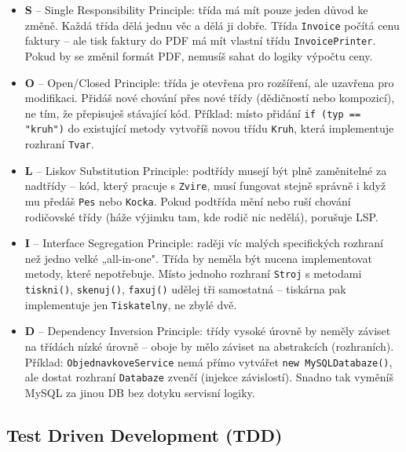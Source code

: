 \begin{itemize}
  \item \textbf{S} -- Single Responsibility Principle: třída má mít pouze jeden důvod ke změně.
    Každá třída dělá jednu věc a dělá ji dobře. Třída \texttt{Invoice} počítá cenu faktury --
    ale tisk faktury do PDF má mít vlastní třídu \texttt{InvoicePrinter}. Pokud by se změnil
    formát PDF, nemusíš sahat do logiky výpočtu ceny.

  \item \textbf{O} -- Open/Closed Principle: třída je otevřena pro rozšíření, ale uzavřena pro
    modifikaci. Přidáš nové chování přes nové třídy (dědičností nebo kompozicí), ne tím, že
    přepisuješ stávající kód. Příklad: místo přidání \texttt{if (typ == "kruh")} do existující
    metody vytvoříš novou třídu \texttt{Kruh}, která implementuje rozhraní \texttt{Tvar}.

  \item \textbf{L} -- Liskov Substitution Principle: podtřídy musejí být plně zaměnitelné za
    nadtřídy -- kód, který pracuje s \texttt{Zvire}, musí fungovat stejně správně i když mu
    předáš \texttt{Pes} nebo \texttt{Kocka}. Pokud podtřída mění nebo ruší chování rodičovské
    třídy (háže výjimku tam, kde rodič nic nedělá), porušuje LSP.

  \item \textbf{I} -- Interface Segregation Principle: raději víc malých specifických rozhraní
    než jedno velké „all-in-one". Třída by neměla být nucena implementovat metody, které
    nepotřebuje. Místo jednoho rozhraní \texttt{Stroj} s metodami \texttt{tiskni()},
    \texttt{skenuj()}, \texttt{faxuj()} udělej tři samostatná -- tiskárna pak implementuje
    jen \texttt{Tiskatelny}, ne zbylé dvě.

  \item \textbf{D} -- Dependency Inversion Principle: třídy vysoké úrovně by neměly záviset
    na třídách nízké úrovně -- oboje by mělo záviset na abstrakcích (rozhraních). Příklad:
    \texttt{ObjednavkoveService} nemá přímo vytvářet \texttt{new MySQLDatabaze()}, ale dostat
    rozhraní \texttt{Databaze} zvenčí (injekce závislostí). Snadno tak vyměníš MySQL za
    jinou DB bez dotyku servisní logiky.
\end{itemize}

\subsection{Test Driven Development (TDD)}

